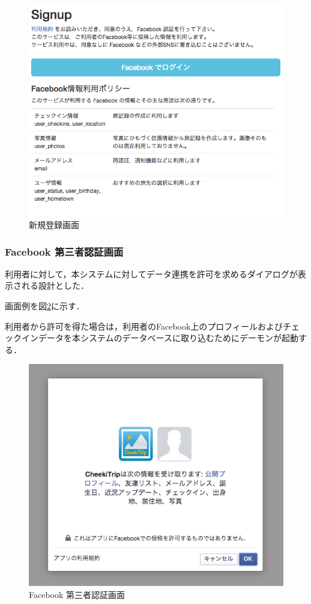 \documentclass{jsarticle}
\begin{document}
\begin{figure}[h!]
\begin{center}
\includegraphics[width=12.0cm]{./image/cheekitrip_signup.png}
\caption{新規登録画面}
\label{screen_signup}
\end{center}
\end{figure}

\subsubsection{Facebook 第三者認証画面}

利用者に対して，本システムに対してデータ連携を許可を求めるダイアログが表示される設計とした．

画面例を図\ref{screen_auth_with_facebook}に示す．

利用者から許可を得た場合は，利用者のFacebook上のプロフィールおよびチェックインデータを本システムのデータベースに取り込むためにデーモンが起動する．

\begin{figure}[h!]
\begin{center}
\includegraphics[width=12cm]{./image/cheekitrip_auth_with_facebook.png}
\caption{Facebook 第三者認証画面}
\label{screen_auth_with_facebook}
\end{center}
\end{figure}
\end{document}
